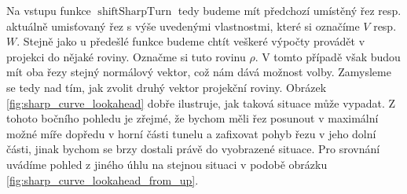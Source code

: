 Na vstupu funkce $ \operatorname{shiftSharpTurn} $ tedy budeme mít předchozí
umístěný řez resp. aktuálně umisťovaný řez s výše uvedenými vlastnostmi,
které si označíme $ V $
resp. $ W $. Stejně jako u předešlé funkce budeme chtít veškeré výpočty provádět
v projekci do nějaké roviny. Označme si tuto rovinu $ \rho $.
V tomto případě však budou mít oba řezy stejný
normálový vektor, což nám dává možnost volby. Zamysleme se tedy nad tím,
jak zvolit druhý vektor projekční roviny. Obrázek \ref{fig:sharp_curve_lookahead}
dobře ilustruje, jak taková situace může vypadat. Z tohoto bočního pohledu je
zřejmé, že bychom měli řez posunout v maximální možné míře dopředu v horní části
tunelu a zafixovat pohyb řezu v jeho dolní části, jinak bychom se brzy dostali
právě do vyobrazené situace. Pro srovnání uvádíme pohled z jiného úhlu na stejnou
situaci v podobě obrázku \ref{fig:sharp_curve_lookahead_from_up}.

